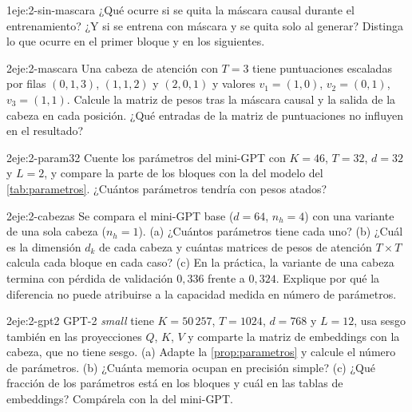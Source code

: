 \begin{ejercicio}{1}{eje:2-sin-mascara}
¿Qué ocurre si se quita la máscara causal durante el entrenamiento? ¿Y si se entrena con máscara y se quita solo al generar? Distinga lo que ocurre en el primer bloque y en los siguientes.
\end{ejercicio}

\begin{ejercicio}{2}{eje:2-mascara}
Una cabeza de atención con $T=3$ tiene puntuaciones escaladas por filas $(0,1,3)$, $(1,1,2)$ y $(2,0,1)$ y valores $v_1=(1,0)$, $v_2=(0,1)$, $v_3=(1,1)$. Calcule la matriz de pesos tras la máscara causal y la salida de la cabeza en cada posición. ¿Qué entradas de la matriz de puntuaciones no influyen en el resultado?
\end{ejercicio}

\begin{ejercicio}{2}{eje:2-param32}
Cuente los parámetros del mini-GPT con $K=46$, $T=32$, $d=32$ y $L=2$, y compare la parte de los bloques con la del modelo del \cref{tab:parametros}. ¿Cuántos parámetros tendría con pesos atados?
\end{ejercicio}

\begin{ejercicio}{2}{eje:2-cabezas}
Se compara el mini-GPT base ($d=64$, $n_h=4$) con una variante de una sola cabeza ($n_h=1$). (a) ¿Cuántos parámetros tiene cada uno? (b) ¿Cuál es la dimensión $d_k$ de cada cabeza y cuántas matrices de pesos de atención $T\times T$ calcula cada bloque en cada caso? (c) En la práctica, la variante de una cabeza termina con pérdida de validación $0{,}336$ frente a $0{,}324$. Explique por qué la diferencia no puede atribuirse a la capacidad medida en número de parámetros.
\end{ejercicio}

\begin{ejercicio}{2}{eje:2-gpt2}
GPT-2 \emph{small} tiene $K=50\,257$, $T=1024$, $d=768$ y $L=12$, usa sesgo también en las proyecciones $Q$, $K$, $V$ y comparte la matriz de embeddings con la cabeza, que no tiene sesgo. (a) Adapte la \cref{prop:parametros} y calcule el número de parámetros. (b) ¿Cuánta memoria ocupan en precisión simple? (c) ¿Qué fracción de los parámetros está en los bloques y cuál en las tablas de embeddings? Compárela con la del mini-GPT.
\end{ejercicio}

